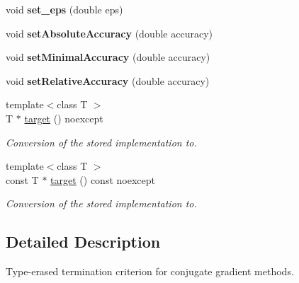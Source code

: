 \begin{DoxyCompactItemize}
\item 
\hypertarget{classSpacy_1_1CG_1_1TerminationCriterion_a3fb31dad926966448b71f65b531e411b}{void {\bfseries set\-\_\-eps} (double eps)}\label{classSpacy_1_1CG_1_1TerminationCriterion_a3fb31dad926966448b71f65b531e411b}

\item 
\hypertarget{classSpacy_1_1CG_1_1TerminationCriterion_a833711290bf75d7cf7450f163f537510}{void {\bfseries set\-Absolute\-Accuracy} (double accuracy)}\label{classSpacy_1_1CG_1_1TerminationCriterion_a833711290bf75d7cf7450f163f537510}

\item 
\hypertarget{classSpacy_1_1CG_1_1TerminationCriterion_a5e16822944d08001fde24212857f4b2a}{void {\bfseries set\-Minimal\-Accuracy} (double accuracy)}\label{classSpacy_1_1CG_1_1TerminationCriterion_a5e16822944d08001fde24212857f4b2a}

\item 
\hypertarget{classSpacy_1_1CG_1_1TerminationCriterion_acea2a40d3f62813a3daa69ebbe8f2d16}{void {\bfseries set\-Relative\-Accuracy} (double accuracy)}\label{classSpacy_1_1CG_1_1TerminationCriterion_acea2a40d3f62813a3daa69ebbe8f2d16}

\item 
{\footnotesize template$<$class T $>$ }\\\-T $\ast$ \hyperlink{classSpacy_1_1CG_1_1TerminationCriterion_abafe9b4bb23fcd4fddfe747eeaa23b03}{target} () noexcept
\begin{DoxyCompactList}\small\item\em \-Conversion of the stored implementation to. \end{DoxyCompactList}\item 
{\footnotesize template$<$class T $>$ }\\const \-T $\ast$ \hyperlink{classSpacy_1_1CG_1_1TerminationCriterion_add14819a4372b5f193dc0adb2321e419}{target} () const noexcept
\begin{DoxyCompactList}\small\item\em \-Conversion of the stored implementation to. \end{DoxyCompactList}\end{DoxyCompactItemize}


\subsection{\-Detailed \-Description}
\-Type-\/erased termination criterion for conjugate gradient methods. 

